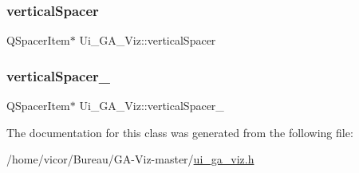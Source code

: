\mbox{\label{class_ui___g_a___viz_ac5fc1a1d98c5614966b52a02f948ad65}} 
\subsubsection{\texorpdfstring{vertical\+Spacer}{verticalSpacer}}
{\footnotesize\ttfamily Q\+Spacer\+Item$\ast$ Ui\+\_\+\+G\+A\+\_\+\+Viz\+::vertical\+Spacer}

\mbox{\label{class_ui___g_a___viz_a65805ffae6e524192de510c7dfe228c2}} 
\subsubsection{\texorpdfstring{vertical\+Spacer\+\_}{verticalSpacer\_2}}
{\footnotesize\ttfamily Q\+Spacer\+Item$\ast$ Ui\+\_\+\+G\+A\+\_\+\+Viz\+::vertical\+Spacer\+\_}



The documentation for this class was generated from the following file\+:\begin{DoxyCompactItemize}
\item 
/home/vicor/\+Bureau/\+G\+A-\/\+Viz-\/master/\hyperlink{ui__ga__viz_8h}{ui\+\_\+ga\+\_\+viz.\+h}\end{DoxyCompactItemize}
